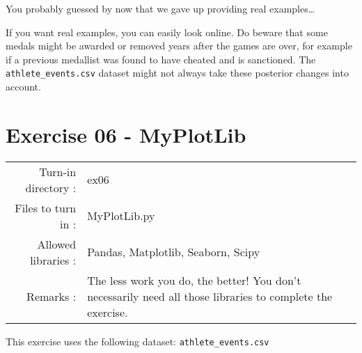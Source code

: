 \documentclass[]{article}
\begin{document}
You probably guessed by now that we gave up providing real
examples\ldots{}

If you want real examples, you can easily look online. Do beware that
some medals might be awarded or removed years after the games are over,
for example if a previous medallist was found to have cheated and is
sanctioned. The \texttt{athlete\_events.csv} dataset might not always
take these posterior changes into account.

\clearpage

\hypertarget{exercise-06---myplotlib-1}{%
\section{Exercise 06 - MyPlotLib}\label{exercise-06---myplotlib-1}}

\begin{longtable}[]{@{}rl@{}}
\toprule
\endhead
\begin{minipage}[t]{0.54\columnwidth}\raggedleft
Turn-in directory :\strut
\end{minipage} & \begin{minipage}[t]{0.40\columnwidth}\raggedright
ex06\strut
\end{minipage}\tabularnewline
\begin{minipage}[t]{0.54\columnwidth}\raggedleft
Files to turn in :\strut
\end{minipage} & \begin{minipage}[t]{0.40\columnwidth}\raggedright
MyPlotLib.py\strut
\end{minipage}\tabularnewline
\begin{minipage}[t]{0.54\columnwidth}\raggedleft
Allowed libraries :\strut
\end{minipage} & \begin{minipage}[t]{0.40\columnwidth}\raggedright
Pandas, Matplotlib, Seaborn, Scipy\strut
\end{minipage}\tabularnewline
\begin{minipage}[t]{0.54\columnwidth}\raggedleft
Remarks :\strut
\end{minipage} & \begin{minipage}[t]{0.40\columnwidth}\raggedright
The less work you do, the better! You don't necessarily need all those
libraries to complete the exercise.\strut
\end{minipage}\tabularnewline
\bottomrule
\end{longtable}

This exercise uses the following dataset: \texttt{athlete\_events.csv}
\end{document}
